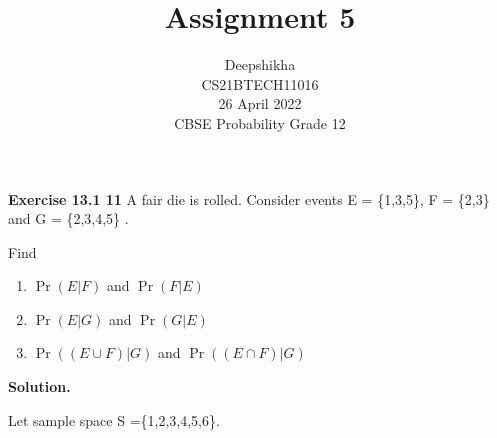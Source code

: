 \documentclass[journal,12pt,twocolumn]{IEEEtran}
\title{Assignment 5 }
\author{Deepshikha \\ \normalsize CS21BTECH11016 \\ \vspace*{20pt} \normalsize  26 April 2022 \\ \vspace*{20pt} \Large CBSE Probability Grade 12}
\providecommand{\pr}[1]{\ensuremath{\Pr\left(#1\right)}}
\begin{document}
	\maketitle
	
	\textbf{Exercise 13.1 11} 
	A fair die is rolled. Consider events E = \{1,3,5\}, F = \{2,3\} and G = \{2,3,4,5\} .
	
	Find
	
	
	\begin{enumerate}[label=(\roman*)]
	\item \pr{E|F} and \pr{F|E}
	\item \pr{E|G} and \pr{G|E}
	\item \pr{(E \cup F)|G} and \pr{(E \cap F)|G}
	\end{enumerate}	 
	
	\textbf{Solution.}
	
	
	Let sample space S =\{1,2,3,4,5,6\}.
	
\end{document}
